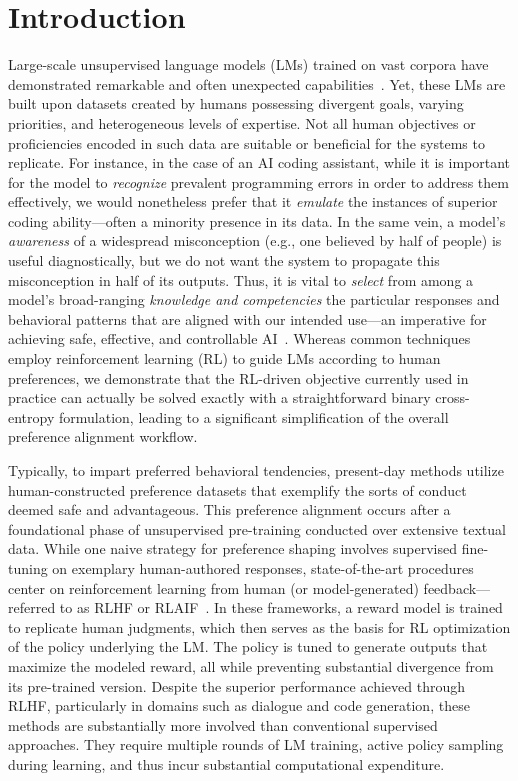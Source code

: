 \section{Introduction}
Large-scale unsupervised language models (LMs) trained on vast corpora have demonstrated remarkable and often unexpected capabilities~\citep{chowdhery2022palm, brown2020language, touvron2023llama,bubeck2023sparks}. Yet, these LMs are built upon datasets created by humans possessing divergent goals, varying priorities, and heterogeneous levels of expertise. Not all human objectives or proficiencies encoded in such data are suitable or beneficial for the systems to replicate. For instance, in the case of an AI coding assistant, while it is important for the model to \textit{recognize} prevalent programming errors in order to address them effectively, we would nonetheless prefer that it \emph{emulate} the instances of superior coding ability—often a minority presence in its data. In the same vein, a model's \textit{awareness} of a widespread misconception (e.g., one believed by half of people) is useful diagnostically, but we do not want the system to propagate this misconception in half of its outputs. Thus, it is vital to \emph{select} from among a model’s broad-ranging \textit{knowledge and competencies} the particular responses and behavioral patterns that are aligned with our intended use—an imperative for achieving safe, effective, and controllable AI~\citep{ouyang2022training}. Whereas common techniques employ reinforcement learning (RL) to guide LMs according to human preferences, we demonstrate that the RL-driven objective currently used in practice can actually be solved exactly with a straightforward binary cross-entropy formulation, leading to a significant simplification of the overall preference alignment workflow.

Typically, to impart preferred behavioral tendencies, present-day methods utilize human-constructed preference datasets that exemplify the sorts of conduct deemed safe and advantageous. This preference alignment occurs after a foundational phase of unsupervised pre-training conducted over extensive textual data. While one naive strategy for preference shaping involves supervised fine-tuning on exemplary human-authored responses, state-of-the-art procedures center on reinforcement learning from human (or model-generated) feedback—referred to as RLHF or RLAIF~\citep{christiano2017deep,bai2022constitutional}. In these frameworks, a reward model is trained to replicate human judgments, which then serves as the basis for RL optimization of the policy underlying the LM. The policy is tuned to generate outputs that maximize the modeled reward, all while preventing substantial divergence from its pre-trained version. Despite the superior performance achieved through RLHF, particularly in domains such as dialogue and code generation, these methods are substantially more involved than conventional supervised approaches. They require multiple rounds of LM training, active policy sampling during learning, and thus incur substantial computational expenditure.

